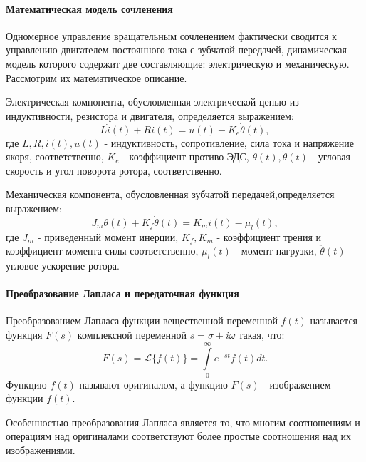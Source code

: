 \paragraph*{Математическая модель сочленения\\}
\hspace*{\parindent} Одномерное управление вращательным сочленением фактически сводится к управлению двигателем постоянного тока с зубчатой передачей, динамическая модель которого содержит две составляющие: электрическую и механическую. Рассмотрим их математическое описание.

Электрическая компонента, обусловленная электрической цепью из индуктивности, резистора и двигателя, определяется выражением:
\begin{equation}\label{1}
	L\dot{i}(t)+Ri(t)=u(t)-K_e\dot{\theta}(t),
\end{equation}
где $L, R, i(t), u(t)$ - индуктивность, сопротивление, сила тока и напряжение якоря, соответственно, $K_e$ - коэффициент противо-ЭДС, $\theta(t), \dot{\theta}(t) $ -  угловая скорость и угол поворота ротора, соответственно.

Механическая  компонента,  обусловленная  зубчатой  передачей,определяется выражением:
\begin{equation}\label{2}
	 J_m\ddot{\theta}(t)+K_f\dot{\theta}(t)=K_mi(t) - \mu_l(t),
\end{equation}
где $J_m$ -  приведенный момент инерции, $K_f, K_m$ - коэффициент трения и коэффициент момента силы соответственно, $\mu_l(t) $ - момент нагрузки, $\ddot{\theta}(t) $ - угловое ускорение ротора.

\paragraph*{Преобразование Лапласа и передаточная функция\\}
\hspace*{\parindent} Преобразованием Лапласа функции вещественной переменной $f(t)$ называется функция $F(s)$ комплексной переменной $s=\sigma+i\omega$ такая, что:
\begin{equation}
	F(s) = \mathcal{L}\{f(t)\} = \int\limits_{0}^{\infty} e^{-st}f(t)dt.
\end{equation}
Функцию $f(t)$ называют оригиналом, а функцию $F(s)$ - изображением функции $f(t)$.

Особенностью преобразования Лапласа является то, что многим соотношениям и операциям над оригиналами соответствуют более простые соотношения над их изображениями. 

